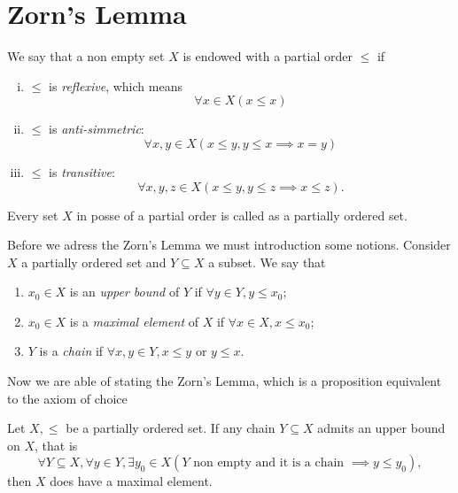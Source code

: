 \documentclass[11pt,twoside,a4paper]{article}
\begin{document}
\section {Zorn's Lemma} \label{sec:zorn}
We say that a non empty set $X$ is endowed with a partial order $\leq$    
if
\begin{enumerate}[(i)]
    \item $\leq$ is \textit{reflexive}, which means
    \begin{equation*}
        \forall x \in X ( x \leq x)
    \end{equation*}

    \item $\leq$ is \textit{anti-simmetric}:
    \begin{equation*}
        \forall x,y \in X ( x \leq y, y \leq x \implies x = y )
    \end{equation*}
    \item $\leq$ is \textit{transitive}:
    \begin{equation*}
        \forall x,y,z \in X (x \leq y, y \leq z \implies x \leq z).
    \end{equation*}
\end{enumerate}
Every set $X$ in posse of a partial order is called as a partially ordered   
set. 

Before we adress the Zorn's Lemma we must introduction some notions.
Consider $X$ a partially ordered set and $Y \subseteq X$ a subset.
We say that 
\begin{enumerate}
    \item $x_0 \in X$ is an \textit{upper bound} of $Y$ if
    $\forall y \in Y, y \leq x_0$;

    \item $x_0 \in X$ is a \textit{maximal element} of $X$ if    
    $\forall x \in X, x \leq x_0$;

    \item $Y$ is a \textit{chain} if 
    $\forall x,y \in Y, x \leq y \text{ or } y \leq x$.
\end{enumerate}

Now we are able of stating the Zorn's Lemma, which is a proposition
equivalent to the axiom of choice
\begin{proposition}
    Let $X, \leq$ be a partially ordered set. If any chain
    $Y \subseteq X$ admits an upper bound on $X$, that is
    \begin{equation*}
        \forall Y \subseteq X, \forall y \in Y, \exists y_0 \in X
        \left(
          Y \text{ non empty and it is a chain } \implies y \leq y_0
        \right),
    \end{equation*}
    then $X$ does have a maximal element.  
\end{proposition}
\end{document}
